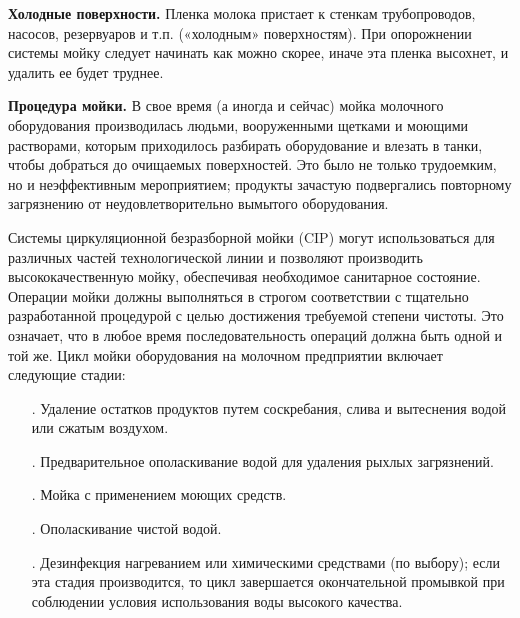 {\addtocounter{imagecntr}{1}

\par \redline \textbf{Холодные поверхности.} Пленка молока пристает к стенкам трубопроводов, насосов, резервуаров и т.п. («холодным» поверхностям). При опорожнении системы мойку следует начинать как можно скорее, иначе эта пленка высохнет, и удалить ее будет труднее.


\par \redline \textbf{Процедура мойки.} В свое время (а иногда и сейчас) мойка молочного оборудования производилась людьми, вооруженными щетками и моющими растворами, которым приходилось разбирать оборудование и влезать в танки, чтобы добраться до очищаемых поверхностей. Это было не только трудоемким, но и неэффективным мероприятием; продукты зачастую подвергались повторному загрязнению от неудовлетворительно вымытого оборудования.

\par \redline Системы циркуляционной безразборной мойки (CIP) могут использоваться для различных частей технологической линии и позволяют производить высококачественную мойку, обеспечивая необходимое санитарное состояние. Операции мойки должны выполняться в строгом соответствии с тщательно разработанной процедурой с целью достижения требуемой степени чистоты. Это означает, что в любое время последовательность операций должна быть одной и той же. Цикл мойки оборудования на молочном предприятии включает следующие стадии:

\begin{itemize}[leftmargin=2.15cm, labelwidth=0.65cm, labelsep=0.0cm] 
	
	\item[\theitemcntr. ] Удаление остатков продуктов путем соскребания, слива и вытеснения водой или сжатым воздухом.
	\addtocounter{itemcntr}{1}
	
	\item[\theitemcntr. ] Предварительное ополаскивание водой для удаления рыхлых загрязнений.
	\addtocounter{itemcntr}{1}
	
	\item[\theitemcntr. ] Мойка с применением моющих средств.
	\addtocounter{itemcntr}{1}
	
	\item[\theitemcntr. ] Ополаскивание чистой водой.
	\addtocounter{itemcntr}{1}
	
	\item[\theitemcntr. ] Дезинфекция нагреванием или химическими средствами (по выбору); если эта стадия производится, то цикл завершается окончательной промывкой при соблюдении условия использования воды высокого качества.
	\addtocounter{itemcntr}{1}
	

\end{itemize}}
